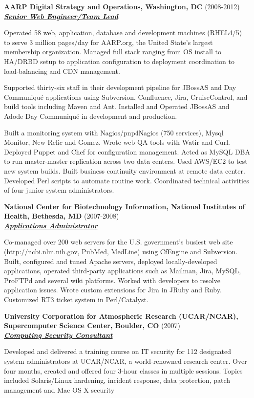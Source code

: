 \documentclass{article}
\newcommand{\employer}[3]{{ \textbf{#1} (#2)\\ \underline{\textbf{\emph{#3}}}\\ \nopagebreak }}
\newenvironment{achievements}{\begin{list}{\topsep 0pt \itemsep -2pt}} {\vspace*{4pt}\end{list}}
\begin{document}
\employer{AARP Digital Strategy and Operations, Washington, DC}{2008-2012}{Senior Web Engineer/Team Lead}
\begin{achievements}
  \item Operated 58 web, application, database and development machines (RHEL4/5) to serve 3 million pages/day for AARP.org, the United State's largest membership organization.  Managed full stack ranging from OS install to HA/DRBD setup to application configuration to deployment coordination to load-balancing and CDN management. 
  \item Supported thirty-six staff in their development pipeline for JBossAS and Day Communiqu\'{e} applications using Subversion, Confluence, Jira, CruiseControl, and build tools including Maven and Ant.  Installed and Operated JBossAS and Adode Day Communiqu\'{e} in development and production.
  \item Built a monitoring system with Nagios/pnp4Nagios (750 services), Mysql Monitor, New Relic and Gomez.  Wrote web QA tools with Watir and Curl. Deployed Puppet and Chef for configuration management. Acted as MySQL DBA to run master-master replication across two data centers. Used AWS/EC2 to test new system builds. Built business continuity environment at remote data center. Developed Perl scripts to automate routine work.  Coordinated technical activities of four junior system administrators.
\end{achievements}


\employer{National Center for Biotechnology Information, National Institutes
of Health, Bethesda, MD}{2007-2008}{Applications Administrator}
\begin{achievements}
   \item Co-managed over 200 web servers for the U.S. government's busiest web site (http://ncbi.nlm.nih.gov, PubMed, MedLine) using CfEngine and Subversion.  Built, configured and tuned Apache servers, deployed locally-developed applications, operated third-party applications such as Mailman, Jira, MySQL, ProFTPd and several wiki platforms.  Worked with developers to resolve application issues.  Wrote custom extensions for Jira in JRuby and Ruby.  Customized RT3 ticket system in Perl/Catalyst.
\end{achievements}

\employer{University Corporation for Atmospheric Research (UCAR/NCAR),
Supercomputer Science Center, Boulder, CO}{2007}{Computing Security Consultant}

\begin{achievements}
\item Developed and delivered a training course on IT security for 112 designated system administrators at UCAR/NCAR, a world-renowned research center.  Over four months, created and offered four 3-hour classes in multiple sessions. Topics included Solaris/Linux hardening, incident response, data protection, patch management and Mac OS X security
\end{achievements}
\end{document}
